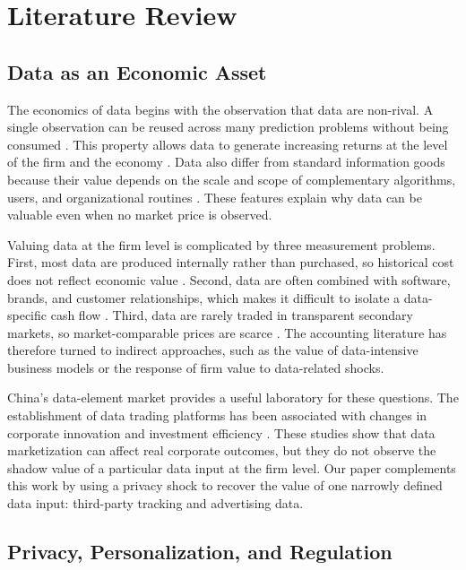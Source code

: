 \section{Literature Review}
\label{sec:literature}

\subsection{Data as an Economic Asset}

The economics of data begins with the observation that data are non-rival. A single observation can be reused across many prediction problems without being consumed \cite{jones2020}. This property allows data to generate increasing returns at the level of the firm and the economy \cite{farboodi2020}. Data also differ from standard information goods because their value depends on the scale and scope of complementary algorithms, users, and organizational routines \cite{bergemann2019}. These features explain why data can be valuable even when no market price is observed.

Valuing data at the firm level is complicated by three measurement problems. First, most data are produced internally rather than purchased, so historical cost does not reflect economic value \cite{oecd2022}. Second, data are often combined with software, brands, and customer relationships, which makes it difficult to isolate a data-specific cash flow \cite{oecd2022}. Third, data are rarely traded in transparent secondary markets, so market-comparable prices are scarce \cite{bergemann2019}. The accounting literature has therefore turned to indirect approaches, such as the value of data-intensive business models or the response of firm value to data-related shocks.

China's data-element market provides a useful laboratory for these questions. The establishment of data trading platforms has been associated with changes in corporate innovation \cite{song2025} and investment efficiency \cite{ma2025}. These studies show that data marketization can affect real corporate outcomes, but they do not observe the shadow value of a particular data input at the firm level. Our paper complements this work by using a privacy shock to recover the value of one narrowly defined data input: third-party tracking and advertising data.

\subsection{Privacy, Personalization, and Regulation}

